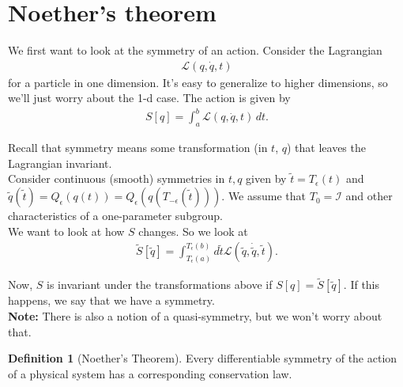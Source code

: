 \documentclass{book}
\theoremstyle{definition}
\newtheorem{defn}{Definition}[section]
\newcommand{\lag}{\mathcal{L}}
\newcommand{\ep}{\epsilon}
\newcommand{\td}[1]{\tilde{#1}}
\newcommand{\Id}{\mathcal{I}}
\begin{document}
\section{Noether's theorem}



We first want to look at the symmetry of an action. Consider the Lagrangian
\begin{align}
\lag(q,\dot{q},t)
\end{align}
for a particle in one dimension. It's easy to generalize to higher dimensions, so we'll just worry about the 1-d case. The action is given by
\begin{align}
S[q] = \int^b_a \lag(q,\dot{q},t)\,dt.
\end{align}

Recall that symmetry means some transformation (in $t$, $q$) that leaves the Lagrangian invariant. \\

Consider continuous (smooth) symmetries in $t,q$ given by $\td{t} = T_\ep (t)$ and $\td{q}(\td{t}) = Q_\ep(q(t)) = Q_\ep (q(T_{-\ep}(\td{t})))$. We assume that $T_0 = \Id$ and other characteristics of a one-parameter subgroup. \\

We want to look at how $S$ changes. So we look at
\begin{align}
\td{S}[\td{q}] = \int^{T_\ep(b)}_{T_\ep(a)} d\td{t} \lag(\td{q}, \dot{\td{q}},\td{t}).
\end{align}

Now, $S$ is invariant under the transformations above if $S[q] = \td{S}[\td{q}]$. If this happens, we say that we have a symmetry. \\

\textbf{Note:} There is also a notion of a quasi-symmetry, but we won't worry about that. \\













\begin{defn}[Noether's Theorem]
	Every differentiable symmetry of the action of a physical system has a corresponding conservation law. 
\end{defn}
\end{document}
